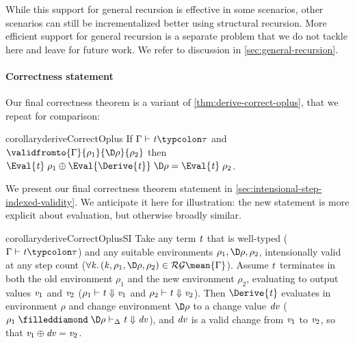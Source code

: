 While this support for general recursion is effective in some
scenarios, other scenarios can still be incrementalized better
using structural recursion.
More efficient support for general recursion is
a separate problem that we do not tackle here and leave for
future work. We refer to discussion in
\cref{sec:general-recursion}.

\paragraph{Correctness statement}
Our final correctness theorem is a variant of
\cref{thm:derive-correct-oplus}, that we repeat for comparison:

\begin{fullCompile}
\deriveCorrectOplus*
\end{fullCompile}
\begin{partCompile}
\begin{restatable*}{corollary}{deriveCorrectOplus}
  \label{thm:derive-correct-oplus}
  If \ensuremath{\Gamma\vdash\Varid{t}\typcolon\tau} and \ensuremath{\validfromto{\Gamma}{\rho_{1}}{\D\rho}{\rho_{2}}} then
  \ensuremath{\Eval{\Varid{t}}\;\rho_{1}\oplus \Eval{\Derive{\Varid{t}}}\;\D\rho\mathrel{=}\Eval{\Varid{t}}\;\rho_{2}}.
\end{restatable*}
\end{partCompile}

We present our final correctness theorem statement in
\cref{sec:intensional-step-indexed-validity}. We anticipate it
here for illustration: the new statement is more explicit about
evaluation, but otherwise broadly similar.

\begin{restatable*}{corollary}{deriveCorrectOplusSI}
  \label{thm:derive-correct-types-si-intensional}
  Take any term \ensuremath{\Varid{t}} that is well-typed (\ensuremath{\Gamma\vdash\Varid{t}\typcolon\tau}) and
  any suitable environments \ensuremath{\rho_{1},\D\rho,\rho_{2}}, intensionally
  valid at any step count (\ensuremath{\forall \Varid{k}\hsforall \hsdot{\circ }{\mathpunct{.}}(\Varid{k},\rho_{1},\D\rho,\rho_{2})\in \mathcal{RG}\mean{\Gamma}}).
  Assume \ensuremath{\Varid{t}} terminates in both the old environment \ensuremath{\rho_{1}} and
  the new environment \ensuremath{\rho_{2}}, evaluating to output values \ensuremath{\Varid{v}_{1}} and
  \ensuremath{\Varid{v}_{2}} (\ensuremath{\rho_{1}\vdash\Varid{t}\Downarrow\Varid{v}_{1}} and \ensuremath{\rho_{2}\vdash\Varid{t}\Downarrow\Varid{v}_{2}}).
  Then \ensuremath{\Derive{\Varid{t}}} evaluates in environment \ensuremath{\rho} and change environment \ensuremath{\D\rho}
  to a change value \ensuremath{\Varid{dv}} (\ensuremath{\rho_{1}\mathrel{\filleddiamond}\D\rho\vdash_{\Delta}\Varid{t}\Downarrow\Varid{dv}}),
  and \ensuremath{\Varid{dv}} is a valid change from \ensuremath{\Varid{v}_{1}} to \ensuremath{\Varid{v}_{2}}, so that \ensuremath{\Varid{v}_{1}\oplus \Varid{dv}\mathrel{=}\Varid{v}_{2}}.
\end{restatable*}

